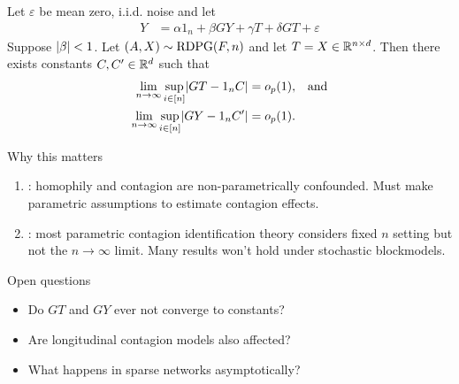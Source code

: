\documentclass[aspectratio=169]{beamer}
\theoremstyle{remark}
\begin{document}
\begin{frame}
    \begin{theorem}
        Let $\varepsilon$ be mean zero, i.i.d. noise and let
        \begin{align*}
            Y & = \alpha 1_n + \beta G Y + \gamma T + \delta G T + \varepsilon                        
        \end{align*}
        Suppose $\lvert\beta\rvert < 1$. Let $(A, X) \sim \text{RDPG}(F, n)$ and let $T = X \in \mathbb{R}^{n \times d}$. Then there exists constants $C, C' \in \mathbb{R}^d$ such that
        \begin{align*}
            \lim_{n \to \infty} \sup_{i \in [n]} \abs*{GT - 1_n C}  & = \op{1},  & \text{and} \\
            \lim_{n \to \infty} \sup_{i \in [n]} \abs*{GY - 1_n C'} & = \op{1}.
        \end{align*}
    \end{theorem}
\end{frame}

\begin{frame}{Why this matters}
    
    \begin{enumerate}
        \item \cite{shalizi2011,mcfowland2021}: homophily and contagion are non-parametrically confounded. Must make parametric assumptions to estimate contagion effects.
        \item \cite{bramoulle2020}: most parametric contagion identification theory considers fixed $n$ setting but not the $n \to \infty$ limit. Many results won't hold under stochastic blockmodels.
    \end{enumerate}
\end{frame}

\begin{frame}{Open questions}
    
    \begin{itemize}
        \item Do $GT$ and $GY$ ever not converge to constants?
        \item Are longitudinal contagion models also affected?
        \item What happens in sparse networks asymptotically?
    \end{itemize}
\end{frame}
\end{document}
